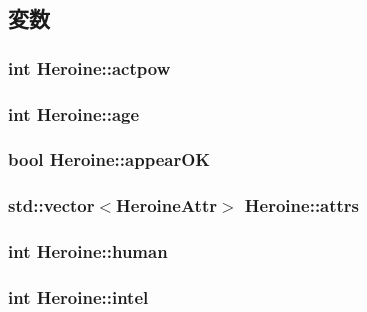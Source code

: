 \subsection{変数}
\hypertarget{class_heroine_ac61fab4be574f24f4acba98ffb378659}{
\subsubsection[{actpow}]{\setlength{\rightskip}{0pt plus 5cm}int {\bf Heroine\-::actpow}}}\label{class_heroine_ac61fab4be574f24f4acba98ffb378659}
\hypertarget{class_heroine_ae4b64050de16a8057995ad6dc16ebcad}{
\subsubsection[{age}]{\setlength{\rightskip}{0pt plus 5cm}int {\bf Heroine\-::age}}}\label{class_heroine_ae4b64050de16a8057995ad6dc16ebcad}
\hypertarget{class_heroine_a076bc8f1ba22d3214059214b6f94b255}{
\subsubsection[{appear\-O\-K}]{\setlength{\rightskip}{0pt plus 5cm}bool {\bf Heroine\-::appear\-O\-K}}}\label{class_heroine_a076bc8f1ba22d3214059214b6f94b255}
\hypertarget{class_heroine_a9ffecfedbbc121692855ca1549cfe4b5}{
\subsubsection[{attrs}]{\setlength{\rightskip}{0pt plus 5cm}std\-::vector$<${\bf Heroine\-Attr}$>$ {\bf Heroine\-::attrs}}}\label{class_heroine_a9ffecfedbbc121692855ca1549cfe4b5}
\hypertarget{class_heroine_a0fa65600a12799447189c09a0bee7b3e}{
\subsubsection[{human}]{\setlength{\rightskip}{0pt plus 5cm}int {\bf Heroine\-::human}}}\label{class_heroine_a0fa65600a12799447189c09a0bee7b3e}
\hypertarget{class_heroine_a085a99674b147d11ea0485dd92ff015e}{
\subsubsection[{intel}]{\setlength{\rightskip}{0pt plus 5cm}int {\bf Heroine\-::intel}}}\label{class_heroine_a085a99674b147d11ea0485dd92ff015e}
